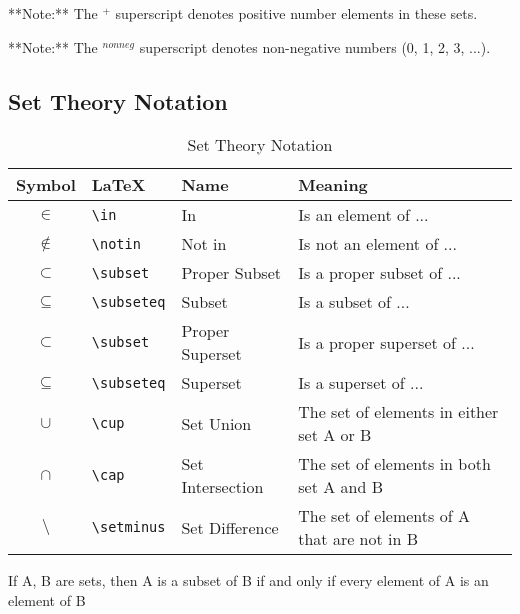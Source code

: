 \documentclass[11pt]{article}
\begin{document}
\starON
**Note:** The $^+$ superscript denotes positive number elements in these sets. 

**Note:** The $^{nonneg}$ superscript denotes non-negative numbers (0, 1, 2, 3, ...). 
\starOFF

\subsection{Set Theory Notation}
\begin{table}[!htbp]
    \centering
    \caption{Set Theory Notation}
    \begin{tabular}{ c l l l }
        \toprule
        Symbol      & LaTeX             & Name              & Meaning \\
        \midrule
        $\in$       & \verb|\in|        & In                & Is an element of ... \\
        $\notin$    & \verb|\notin|     & Not in            & Is not an element of ... \\
        $\subset$   & \verb|\subset|    & Proper Subset     & Is a proper subset of ... \\
        $\subseteq$ & \verb|\subseteq|  & Subset            & Is a subset of ... \\
        $\subset$   & \verb|\subset|    & Proper Superset   & Is a proper superset of ... \\
        $\subseteq$ & \verb|\subseteq|  & Superset          & Is a superset of ... \\
        $\cup$      & \verb|\cup|       & Set Union         & The set of elements in either set A or B \\
        $\cap$      & \verb|\cap|       & Set Intersection  & The set of elements in both set A and B \\
        $\setminus$ & \verb|\setminus|  & Set Difference    & The set of elements of A that are not in B \\
        \bottomrule
    \end{tabular}
    \label{tab:tbl-set-theory-notation}
\end{table}

\newpage

\begin{definition}[Subset]\label{def:subset-txt}
If A, B are sets, then A is a subset of B if and only if every element of A is an element of B
\end{definition}

\end{document}

